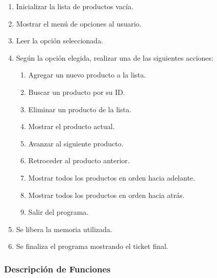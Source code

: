 \documentclass[letterpaper,12pt,oneside]{article}
\begin{document}
\begin{enumerate}
    \item Inicializar la lista de productos vacía.
    \item Mostrar el menú de opciones al usuario.
    \item Leer la opción seleccionada.
    \item Según la opción elegida, realizar una de las siguientes acciones:
    \begin{enumerate}
        \item Agregar un nuevo producto a la lista.
        \item Buscar un producto por su ID.
        \item Eliminar un producto de la lista.
        \item Mostrar el producto actual.
        \item Avanzar al siguiente producto.
        \item Retroceder al producto anterior.
        \item Mostrar todos los productos en orden hacia adelante.
        \item Mostrar todos los productos en orden hacia atrás.
        \item Salir del programa.
    \end{enumerate}
    \item Se libera la memoria utilizada.
    \item Se finaliza el programa mostrando el ticket final.
\end{enumerate}

\subsubsection{Descripción de Funciones}
\end{document}
